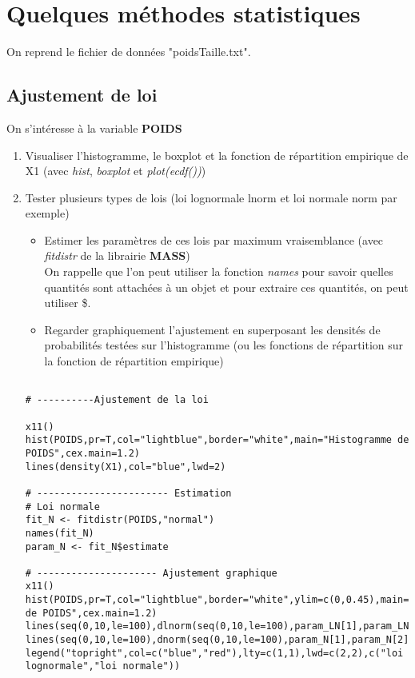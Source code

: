 \documentclass[12pt,twoside,openright]{article}
\begin{document}
\section{Quelques méthodes statistiques}
On reprend le fichier de données "poidsTaille.txt".

\subsection{Ajustement de loi}
On s'intéresse à la variable {\bf POIDS}
\begin{enumerate}
\item Visualiser l’histogramme, le boxplot et la fonction de répartition empirique de X1 (avec \emph{ hist},
 \emph{boxplot} et  \emph{plot(ecdf())})
\item Tester plusieurs types de lois (loi lognormale lnorm et loi normale norm par exemple)
\begin{itemize}
\item Estimer les paramètres de ces lois par maximum vraisemblance (avec \emph{fitdistr} de la librairie
{\bf MASS})\\
On rappelle que l’on peut utiliser la fonction \emph{names} pour savoir quelles quantités sont attachées
à un objet et pour extraire ces quantités, on peut utiliser \$.
\item Regarder graphiquement l’ajustement en superposant les densités de probabilités testées sur
l’histogramme (ou les fonctions de répartition sur la fonction de répartition empirique)
\end{itemize}
%
\begin{verbatim}

# ----------Ajustement de la loi

x11()
hist(POIDS,pr=T,col="lightblue",border="white",main="Histogramme de POIDS",cex.main=1.2)
lines(density(X1),col="blue",lwd=2)

# ----------------------- Estimation
# Loi normale
fit_N <- fitdistr(POIDS,"normal")
names(fit_N)
param_N <- fit_N$estimate

# --------------------- Ajustement graphique
x11()
hist(POIDS,pr=T,col="lightblue",border="white",ylim=c(0,0.45),main="Histogramme de POIDS",cex.main=1.2)
lines(seq(0,10,le=100),dlnorm(seq(0,10,le=100),param_LN[1],param_LN[2]),lwd=2,col="blue")
lines(seq(0,10,le=100),dnorm(seq(0,10,le=100),param_N[1],param_N[2]),lwd=2,col="red")
legend("topright",col=c("blue","red"),lty=c(1,1),lwd=c(2,2),c("loi lognormale","loi normale"))


\end{verbatim}
\end{enumerate}
\end{document}

